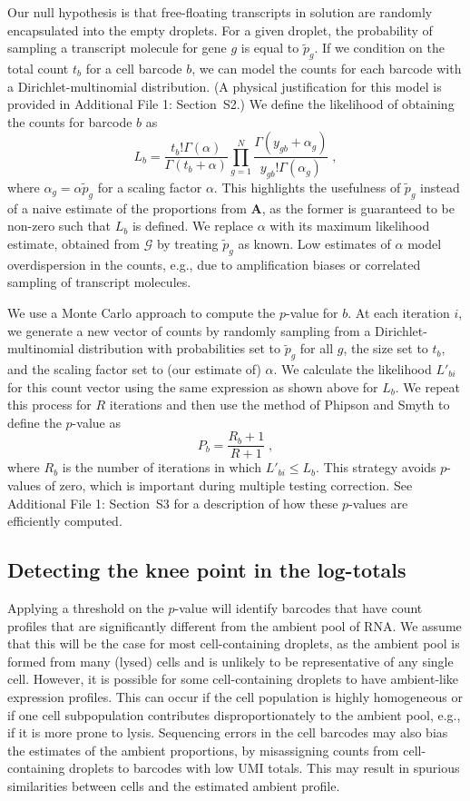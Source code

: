 \documentclass{bmcart}
\newcommand{\ADD}[1]{Additional File 1: #1}
\newcommand{\suppsecphysical}{S2}
\newcommand{\suppsecmontecarlo}{S3}
\begin{document}
Our null hypothesis is that free-floating transcripts in solution are randomly encapsulated into the empty droplets.
For a given droplet, the probability of sampling a transcript molecule for gene $g$ is equal to $\tilde{p}_g$.
If we condition on the total count $t_b$ for a cell barcode $b$, we can model the counts for each barcode with a Dirichlet-multinomial distribution.
(A physical justification for this model is provided in \ADD{Section~\suppsecphysical{}}.)
We define the likelihood of obtaining the counts for barcode $b$ as 
\[
    L_b = \frac{t_b!\Gamma(\alpha)}{\Gamma(t_b + \alpha)} \prod_{g=1}^N \frac{\Gamma(y_{gb}+\alpha_g)}{y_{gb}!\Gamma(\alpha_g)} \;,
\]
where $\alpha_g = \alpha\tilde{p}_g$ for a scaling factor $\alpha$.
This highlights the usefulness of $\tilde p_g$ instead of a naive estimate of the proportions from $\mathbf{A}$, as the former is guaranteed to be non-zero such that $L_b$ is defined.
We replace $\alpha$ with its maximum likelihood estimate, obtained from $\mathcal{G}$ by treating $\tilde{p}_g$ as known.
Low estimates of $\alpha$ model overdispersion in the counts, e.g., due to amplification biases or correlated sampling of transcript molecules.

We use a Monte Carlo approach to compute the $p$-value for $b$.
At each iteration $i$, we generate a new vector of counts by randomly sampling from a Dirichlet-multinomial distribution with probabilities set to $\tilde{p}_g$ for all $g$, the size set to $t_b$, and the scaling factor set to (our estimate of) $\alpha$.
We calculate the likelihood $L'_{bi}$ for this count vector using the same expression as shown above for $L_b$.
We repeat this process for $R$ iterations and then use the method of Phipson and Smyth \cite{phipson2010permutation} to define the $p$-value as 
\[
    P_b = \frac{R_b +1 }{R + 1} \;,
\]
where $R_b$ is the number of iterations in which $L'_{bi} \le L_b$.
This strategy avoids $p$-values of zero, which is important during multiple testing correction.
See \ADD{Section~\suppsecmontecarlo{}} for a description of how these $p$-values are efficiently computed.

\subsection*{Detecting the knee point in the log-totals}
Applying a threshold on the $p$-value will identify barcodes that have count profiles that are significantly different from the ambient pool of RNA.
We assume that this will be the case for most cell-containing droplets, as the ambient pool is formed from many (lysed) cells and is unlikely to be representative of any single cell.
However, it is possible for some cell-containing droplets to have ambient-like expression profiles.
This can occur if the cell population is highly homogeneous or if one cell subpopulation contributes disproportionately to the ambient pool, e.g., if it is more prone to lysis.
Sequencing errors in the cell barcodes may also bias the estimates of the ambient proportions, by misassigning counts from cell-containing droplets to barcodes with low UMI totals.
This may result in spurious similarities between cells and the estimated ambient profile.
\end{document}
